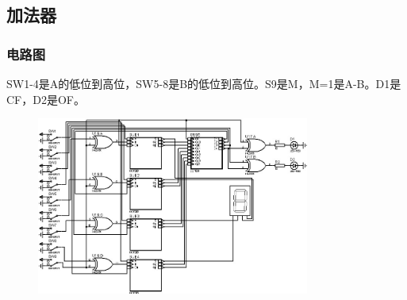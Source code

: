 \documentclass[UTF8, a4paper, 11pt]{article}
\begin{document}
\subsection{加法器}
\subsubsection{电路图}
SW1-4是A的低位到高位，SW5-8是B的低位到高位。S9是M，M=1是A-B。D1是CF，D2是OF。
\begin{figure}[H]
    \centering
    \includegraphics[width=0.8\textwidth]{ex7.2电路图.jpg}
\end{figure}
\end{document}

